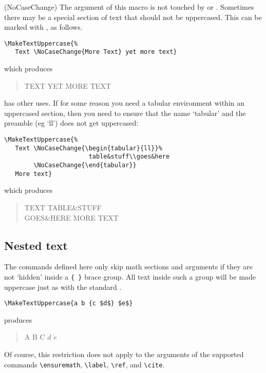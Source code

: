 \begin{syntax}
  \cmd{\NoCaseChange}
\end{syntax}
\glossary(NoCaseChange)
 {}
 {The argument of this macro is not touched by 
   or .}
Sometimes there may be a special section of text that should not be
uppercased. This can be marked with \cmd{\NoCaseChange}, as follows.
\begin{verbatim}
\MakeTextUppercase{% 
   Text \NoCaseChange{More Text} yet more text}
\end{verbatim}
which produces
\begin{quotation}
\MakeTextUppercase{%
   Text  yet more text}
\end{quotation}

\cmd{\NoCaseChange} has other uses. If for some reason you need a
tabular environment within an uppercased section, then you need
to ensure that the name `tabular' and the preamble (eg `ll')
does not get uppercased:
\begin{verbatim}
\MakeTextUppercase{%
   Text \NoCaseChange{\begin{tabular}{ll}}%
                       table&stuff\\goes&here
        \NoCaseChange{\end{tabular}}
   More text}
\end{verbatim}
which produces
\begin{quotation}
\MakeTextUppercase{%
   Text %
                       table&stuff\\goes&here
        \NoCaseChange{\end{tabular}}
   More text}
\end{quotation}

\subsection{Nested text}
The commands defined here only skip math sections and \cmd{\ref} arguments
if they are not `hidden' inside a \verb|{ }| brace group. All text inside
such a group will be made uppercase just as with the standard
\cmd{\MakeUppercase}.
\begin{verbatim}
\MakeTextUppercase{a b {c $d$} $e$}
\end{verbatim}
produces
\begin{quotation}
 \MakeTextUppercase{a b {c $d$} $e$}
\end{quotation}
Of course, this restriction does not apply to the arguments of the
supported commands \verb|\ensuremath|, \verb|\label|, \verb|\ref|, and
\verb|\cite|.

